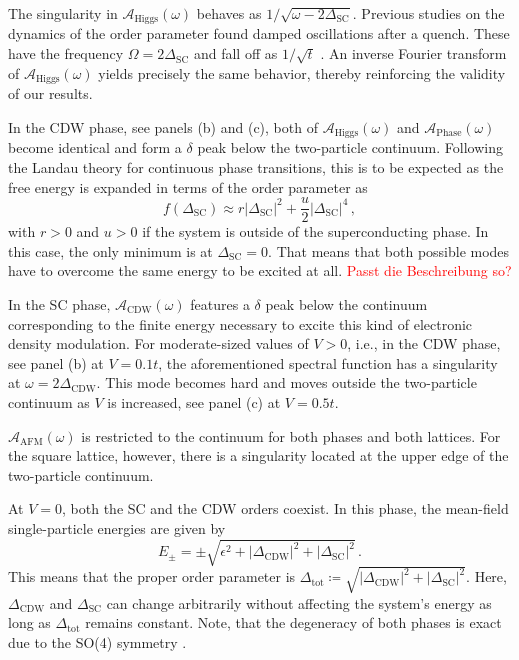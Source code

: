 \documentclass[
    reprint, 
    aps,
    preprintnumbers,
    twocolumn,
    prb,
    superscriptaddress
]{revtex4-2}
\newcommand{\spectral}[1]{\mathcal{A}_\text{#1}  (\omega)}
\begin{document}
The singularity in $\spectral{Higgs}$ behaves as $1/\sqrt{\omega - 2 \Delta_\text{SC}}$.
Previous studies on the dynamics of the order parameter found damped oscillations after a quench.
These have the frequency $\Omega = 2 \Delta_\text{SC}$ and fall off as $1/\sqrt{t}$ \cite{Yuzbashyan06}.
An inverse Fourier transform of $\spectral{Higgs}$ yields precisely the same behavior, thereby reinforcing the validity of our results.

In the CDW phase, see panels (b) and (c), both of $\spectral{Higgs}$ and $\spectral{Phase}$ become identical and form a $\delta$ peak below the two-particle continuum.
Following the Landau theory for continuous phase transitions, this is to be expected as the free energy is expanded in terms of the order parameter as
\begin{equation}
    f(\Delta_\text{SC}) \approx r |\Delta_\text{SC}|^2 + \frac{u}{2} |\Delta_\text{SC}|^4\,,
\end{equation}
with $r > 0$ and $u > 0$ if the system is outside of the superconducting phase. 
In this case, the only minimum is at $\Delta_\text{SC} = 0$. 
That means that both possible modes have to overcome the same energy to be excited at all. \textcolor{red}{Passt die Beschreibung so?}

In the SC phase, $\spectral{CDW}$ features a $\delta$ peak below the continuum corresponding to the finite energy necessary to excite this kind of electronic density modulation.
For moderate-sized values of $V>0$, i.e., in the CDW phase, see panel (b) at $V=0.1t$, the aforementioned spectral function has a singularity at $\omega=2\Delta_\text{CDW}$.%
This mode becomes hard and moves outside the two-particle continuum as $V$ is increased, see panel (c) at $V=0.5t$.

$\spectral{AFM}$ is restricted to the continuum for both phases and both lattices.
For the square lattice, however, there is a singularity located at the upper edge of the two-particle continuum.


At $V=0$, both the SC and the CDW orders coexist. 
In this phase, the mean-field single-particle energies are given by
\begin{equation}
    E_{\pm} = \pm \sqrt{\epsilon^2 + |\Delta_\text{CDW}|^2 + |\Delta_\text{SC}|^2}\,.
\end{equation}
This means that the proper order parameter is $\Delta_\text{tot} \coloneqq \sqrt{|\Delta_\text{CDW}|^2 + |\Delta_\text{SC}|^2}$.
Here, $\Delta_\text{CDW}$ and $\Delta_\text{SC}$ can change arbitrarily without affecting the system's energy as long as $\Delta_\text{tot}$ remains constant.
Note, that the degeneracy of both phases is exact due to the SO(4) symmetry \cite{yang90}. 
\end{document}
